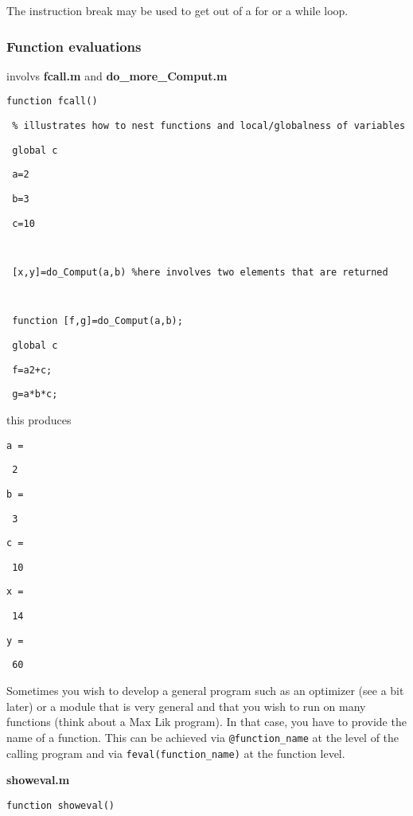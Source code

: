 \documentclass[12pt,a4paper]{article}
\begin{document}
The instruction break may be used to get out of a for or a while loop.\ \ \ 

\subsubsection{Function evaluations}

involvs \textbf{fcall.m} and \textbf{do\_more\_Comput.m}

\texttt{function fcall()}

\texttt{\ \% illustrates how to nest functions and local/globalness of
variables}

\texttt{\ global c}

\texttt{\ a=2}

\texttt{\ b=3}

\texttt{\ c=10}

\texttt{\ }

\texttt{\ [x,y]=do\_Comput(a,b) \%here involves two elements that are
returned}

\texttt{\ }

\texttt{\ function [f,g]=do\_Comput(a,b);}

\texttt{\ global c}

\texttt{\ f=a2+c; }

\texttt{\ g=a*b*c;}

\bigskip

this produces

\texttt{a =}

\texttt{\ 2}

\texttt{b =}

\texttt{\ 3}

\texttt{c =}

\texttt{\ 10}

\texttt{x =}

\texttt{\ 14}

\texttt{y =}

\texttt{\ 60}

Sometimes you wish to develop a general program such as an optimizer (see a
bit later) or a module that is very general and that you wish to run on many
functions (think about a Max Lik program). In that case, you have to provide
the name of a function. This can be achieved via \texttt{@function\_name} at
the level of the calling program and via \texttt{feval(function\_name)} at
the function level.

\textbf{showeval.m}

\texttt{function showeval()}
\end{document}
